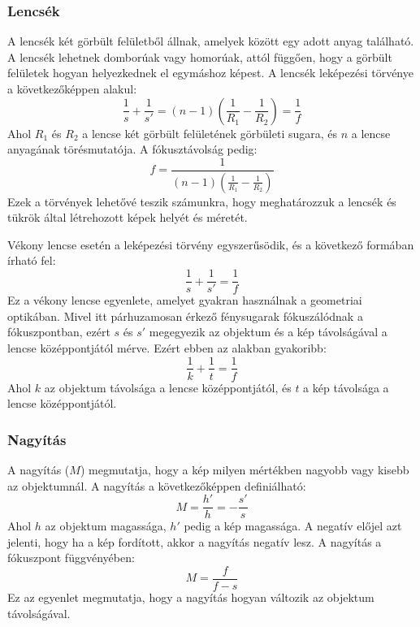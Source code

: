 \documentclass[a4paper,12pt]{article}
\begin{document}
\subsubsection*{Lencsék}
A lencsék két görbült felületből állnak, amelyek között egy adott anyag található. A lencsék lehetnek domborúak vagy homorúak, attól függően, hogy a görbült felületek hogyan helyezkednek el egymáshoz képest. A lencsék leképezési törvénye a következőképpen alakul:
\begin{equation}
    \boxed{\frac{1}{s} + \frac{1}{s'} = (n - 1) \left(\frac{1}{R_1} - \frac{1}{R_2}\right) = \frac{1}{f}}
\end{equation}
Ahol $R_1$ és $R_2$ a lencse két görbült felületének görbületi sugara, és $n$ a lencse anyagának törésmutatója. A fókusztávolság pedig:
\begin{equation}
    \boxed{f = \frac{1}{(n - 1) \left(\frac{1}{R_1} - \frac{1}{R_2}\right)}}
\end{equation}
Ezek a törvények lehetővé teszik számunkra, hogy meghatározzuk a lencsék és tükrök által létrehozott képek helyét és méretét.

Vékony lencse esetén a leképezési törvény egyszerűsödik, és a következő formában írható fel:
\begin{equation}
    \frac{1}{s} + \frac{1}{s'} = \frac{1}{f}
\end{equation}
Ez a vékony lencse egyenlete, amelyet gyakran használnak a geometriai optikában. Mivel itt párhuzamosan érkező fénysugarak fókuszálódnak a fókuszpontban, ezért $s$ és $s'$
megegyezik az objektum és a kép távolságával a lencse középpontjától mérve. Ezért ebben az alakban gyakoribb:
\begin{equation}
    \frac{1}{k} + \frac{1}{t} = \frac{1}{f}
\end{equation}
Ahol $k$ az objektum távolsága a lencse középpontjától, és $t$ a kép távolsága a lencse középpontjától.

\subsubsection*{Nagyítás}
A nagyítás ($M$) megmutatja, hogy a kép milyen mértékben nagyobb vagy kisebb az objektumnál. A nagyítás a következőképpen definiálható:
\begin{equation}
    M = \frac{h'}{h} = - \frac{s'}{s}
\end{equation}
Ahol $h$ az objektum magassága, $h'$ pedig a kép magassága. A negatív előjel azt jelenti, hogy ha a kép fordított, akkor a nagyítás negatív lesz. A nagyítás a fókuszpont függvényében:
\begin{equation}
    M = \frac{f}{f - s}
\end{equation}
Ez az egyenlet megmutatja, hogy a nagyítás hogyan változik az objektum távolságával.
\end{document}
